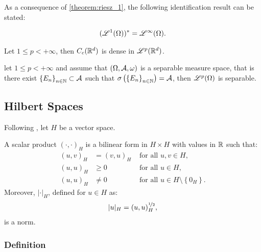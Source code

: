 As a consequence of \cref{theorem:riesz_1}, the following identification result can be stated:

\begin{theorem}
    \begin{align}
        (\mathscr{L}^{1}(\Omega))^* = \mathscr{L}^{\infty}(\Omega).
    \end{align}
\end{theorem}

\begin{theorem}
    Let $1 \leq p < +\infty$, then $C_c(\mathbb{R}^{d})$ is dense in $\mathscr{L}^{p}(\mathbb{R}^{d})$.
\end{theorem}

\begin{theorem}
    let $1 \leq p < +\infty$ and assume that $(\Omega, \mathcal{A}, \omega)$ is a separable measure space, that is there exist $\left\{ E_n \right\}_{n \in \mathbb{N}} \subset \mathcal{A}$ such that $\sigma \left( \left\{ E_n \right\}_{n \in \mathbb{N}} \right) = \mathcal{A}$, then $\mathscr{L}^{p}(\Omega)$ is separable.
\end{theorem}

\newpage
\subsection{Hilbert Spaces}

Following \cite[p.~131]{Brezis2010}, let $H$ be a vector space.

\begin{definition}
    A scalar product $\left( \cdot, \cdot \right)_H$ is a bilinear form in $H \times H$ with values in $\mathbb{R}$ such that:
    \begin{align}
        (u, v)_H & = (v, u)_H &\text{ for all } u, v \in H, \\
        (u, u)_H & \geq 0 &\text{ for all } u \in H, \\
        (u, u)_H & \neq 0 &\text{ for all } u \in H \setminus \left\{ 0_H \right\}.
    \end{align}
    Moreover, $\lvert \cdot \rvert_H$, defined for $u \in H$ as:
    \begin{align} %
        \lvert u \rvert_H = (u, u)_H^{\nicefrac12},
    \end{align}
    is a norm.
\end{definition}

\subsubsection{Definition}

